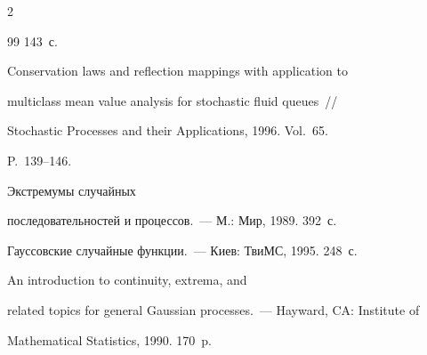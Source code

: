 \begin{multicols}{2}
{{\begin{thebibliography}{99}
143~с.









Conservation laws and reflection mappings with application to


multiclass mean value analysis for stochastic fluid queues~// 


Stochastic Processes and their Applications, 1996. Vol.~65.


P.~139--146.







 Экстремумы случайных


последовательностей и процессов.~--- М.: Мир, 1989. 392~с.







 Гауссовские случайные функции.~--- Киев: ТвиМС, 1995. 248~с.





\label{end\stat}







 An introduction to continuity, extrema, and


related topics for general Gaussian processes.~--- Hayward, CA: Institute of


Mathematical Statistics, 1990. 170~p.


 \end{thebibliography}


}


}








\end{multicols}


